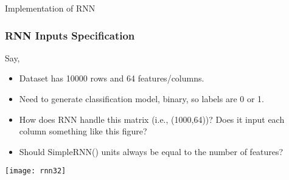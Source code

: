 

\begin{frame}
  \begin{center}
    {\Large Implementation of RNN}
  \end{center}
\end{frame}

\begin{frame}[fragile] \frametitle{RNN Inputs Specification}
Say,
\begin{itemize}
\item Dataset has 10000 rows and 64 features/columns.
\item Need to generate classification model, binary, so labels are 0 or 1.
\item How does RNN handle this matrix (i.e., (1000,64))? Does it input each column something like this figure?
\item Should SimpleRNN() units always be equal to the number of features?
\end{itemize}

\begin{center}
\texttt{[image: rnn32]}
\end{center}


\end{frame}

